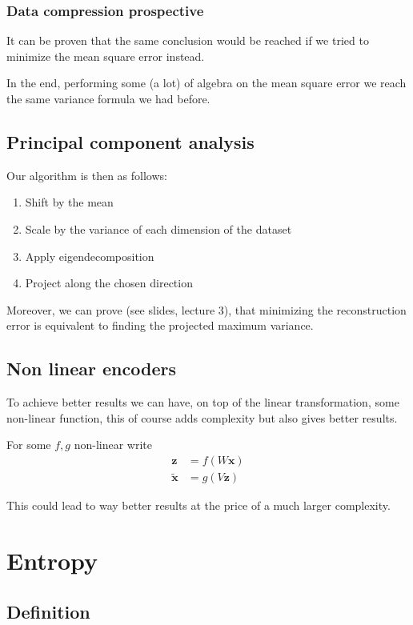 \documentclass[12pt]{extarticle}
\renewcommand{\vec}[1]{\bm{#1}}
\begin{document}
\subsubsection{Data compression prospective}
It can be proven that the same conclusion would be reached if we tried to minimize the mean square
error instead.

In the end, performing some (a lot) of algebra on the mean square error we reach the same variance
formula we had before.

\subsection{Principal component analysis}

Our algorithm is then as follows:
\begin{enumerate}[label=\roman*.]
	\item Shift by the mean
	\item Scale by the variance of each dimension of the dataset
	\item Apply eigendecomposition
	\item Project along the chosen direction
\end{enumerate}

Moreover, we can prove (see slides, lecture 3), that minimizing the reconstruction error
is equivalent to finding the projected maximum variance.

\subsection{Non linear encoders}
To achieve better results we can have, on top of the linear transformation, some non-linear function,
this of course adds complexity but also gives better results.

For some $f, g$ non-linear write
\begin{align}
	\vec z          & = f(W \vec x) \\
	\vec {\tilde x} & = g(V \vec z)
\end{align}

This could lead to way better results at the price of a much larger complexity.

\section{Entropy}

\subsection{Definition}
\end{document}
